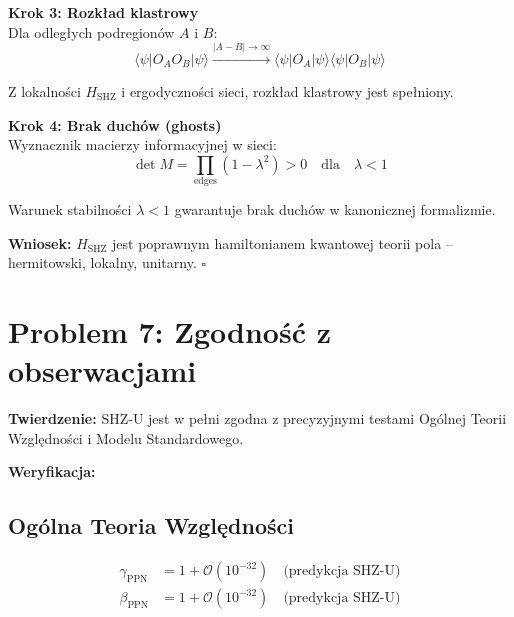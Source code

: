 \documentclass[11pt,a4paper]{article}
\begin{document}
\bigskip

\textbf{Krok 3: Rozkład klastrowy}\\

Dla odległych podregionów $A$ i $B$:
\begin{equation}
\langle \psi | O_A O_B | \psi \rangle \xrightarrow{|A-B| \to \infty} \langle \psi | O_A | \psi \rangle \langle \psi | O_B | \psi \rangle
\end{equation}

Z lokalności $H_{\text{SHZ}}$ i ergodyczności sieci, rozkład klastrowy jest spełniony.

\bigskip

\textbf{Krok 4: Brak duchów (ghosts)}\\

Wyznacznik macierzy informacyjnej w sieci:
\begin{equation}
\det M = \prod_{\text{edges}} (1 - \lambda^2) > 0 \quad \text{dla} \quad \lambda < 1
\end{equation}

Warunek stabilności $\lambda < 1$ gwarantuje brak duchów w kanonicznej formalizmie.

\bigskip

\textbf{Wniosek:} $H_{\text{SHZ}}$ jest poprawnym hamiltonianem kwantowej teorii pola -- hermitowski, lokalny, unitarny. $\square$

\bigskip

\section{Problem 7: Zgodność z obserwacjami}

\bigskip

\textbf{Twierdzenie:} SHZ-U jest w pełni zgodna z precyzyjnymi testami Ogólnej Teorii Względności i Modelu Standardowego.

\bigskip

\textbf{Weryfikacja:}

\bigskip

\subsection{Ogólna Teoria Względności}

\begin{align}
\gamma_{\text{PPN}} &= 1 + \mathcal{O}(10^{-32}) \quad \text{(predykcja SHZ-U)} \\
\beta_{\text{PPN}} &= 1 + \mathcal{O}(10^{-32}) \quad \text{(predykcja SHZ-U)}
\end{align}
\end{document}
